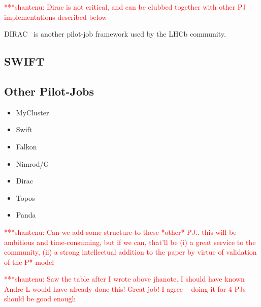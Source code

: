 \documentclass[conference,final]{IEEEtran}
\newcommand{\jhanote}[1]{ {\textcolor{red} { ***shantenu: #1 }}}
\newcommand{\jhanote}[1]{}
\begin{document}
\jhanote{Dirac is not critical, and can be clubbed together with other
  PJ implementations described below}

DIRAC~\cite{1742-6596-219-6-062049} is another pilot-job framework used by the 
LHCb community.

\subsection{SWIFT}

\subsection{Other Pilot-Jobs}

\begin{itemize}
    \item MyCluster
    \item Swift
    \item Falkon
    \item Nimrod/G
    \item Dirac
    \item Topos
    \item Panda    
\end{itemize}

\jhanote{Can we add some structure to these *other* PJ.. this will be
  ambitious and time-consuming, but if we can, that'll be (i) a great
  service to the community, (ii) a strong intellectual addition to the
  paper by virtue of validation of the P*-model}

\jhanote{Saw the table after I wrote above jhanote. I should have
  known Andre L would have already done this! Great job! I agree --
  doing it for 4 PJs should be good enough}
\end{document}
